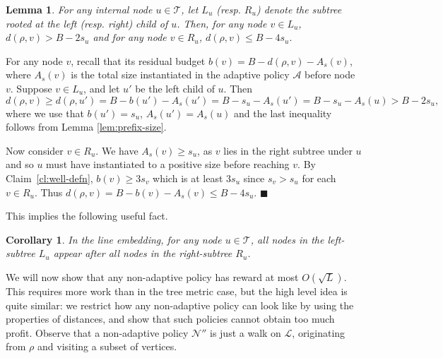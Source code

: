 \documentclass[11pt,letterpaper]{article}
\newtheorem{lemma}[theorem]{Lemma}
\newtheorem{corollary}[theorem]{Corollary}
\numberwithin{algorithm}{section}
\newenvironment{proof}{

\noindent{\bf Proof:}}
{\hfill$\blacksquare$


}
\newcommand{\A}[0]{{\ensuremath{\mathcal{A}}}\xspace}
\newcommand{\lm}[0]{{\ensuremath{\mathcal{L}}}\xspace}
\newcommand{\N}[0]{{\ensuremath{\mathcal{N}}}\xspace}
\newcommand{\T}{\ensuremath{\mathcal{T}}\xspace}
\begin{document}
\begin{lemma}
\label{lem:dist-lr}
 For any internal node $u \in \T$, let $L_u$ (resp. $R_u$) denote the subtree rooted at the left (resp. right) child of $u$.
Then, for any node $v \in L_u$, $ d(\rho,v) > B-2 s_u$ and
for any node $v \in R_u$,
$d(\rho,v)  \leq B - 4 s_u.$
\end{lemma}
\begin{proof}
For any node $v$, recall that its residual budget $b(v) = B - d(\rho,v)-A_s(v)$, where $A_s(v)$ is the total size instantiated in the adaptive policy \A before node $v$.
Suppose $v \in L_u$, and let $u'$ be the left child of $u$. Then
 $$d(\rho,v) \geq d(\rho,u') = B - b(u') - A_s(u') = B-s_u - A_s(u') = B - s_u - A_s(u) > B -2 s_u,$$
 where we use that $b(u')=s_u$, $A_s(u')=A_s(u)$ and the last inequality follows from Lemma \ref{lem:prefix-size}.

 Now consider $v \in R_u$.
  We have $A_s(v) \geq s_u$, as $v$ lies in the right subtree under $u$ and so $u$ must have instantiated to a positive size before reaching $v$.
By Claim~\ref{cl:well-defn}, $b(v) \geq 3 s_v$ which is at least $3 s_u$ since $s_v > s_u$ for each $v\in R_u$. Thus $d(\rho,v)=
B - b(v) - A_s(v)  \leq B - 4s_u$.
\end{proof}

This implies the following useful fact.
 \begin{corollary}
 \label{cor:left-right}
 In the line embedding, for any node $u\in \T$, all nodes in the left-subtree $L_u$ appear after all nodes in the right-subtree $R_u$.
 \end{corollary}

We will now show that any non-adaptive policy has reward at most $O(\sqrt{L})$. This requires more work than in the tree metric case, but the high level idea is quite similar:
we restrict how any non-adaptive policy can look like by using the properties of distances, and show that such policies cannot obtain too much profit.
Observe that a non-adaptive policy $\N''$ is just a walk on \lm, originating from $\rho$ and  visiting a subset of vertices.
\end{document}
